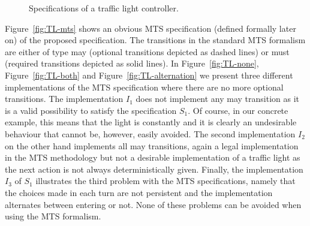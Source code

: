 \begin{figure}[ht]
{ }

\caption{Specifications of a traffic light controller.}
\end{figure}

Figure~\ref{fig:TL-mts} shows an obvious MTS specification (defined
formally later on) of the proposed specification. 
The transitions in the standard MTS formalism are either of type
may (optional transitions depicted as dashed lines) or must 
(required transitions depicted as solid lines). 
In Figure~\ref{fig:TL-none}, Figure~\ref{fig:TL-both} and 
Figure~\ref{fig:TL-alternation} we present three different implementations 
of the MTS specification where there are no more optional transitions.
The implementation $I_1$ does not implement any may transition as it  
is a valid possibility to satisfy the specification $S_1$.
Of course, in our concrete example, this means that the light is constantly
\green and it is clearly an undesirable behaviour that cannot be, however,
easily avoided. 
The second implementation $I_2$ on the %
other hand implements all may transitions, again a legal implementation
in the MTS methodology but not a desirable implementation of a traffic
light as the next action is not always deterministically given. Finally, the implementation $I_3$ of $S_1$ 
illustrates the third problem with the MTS specifications, namely
that the choices made in each turn are not persistent and the
implementation alternates between entering \yellow or not.
None of these problems can be avoided when using the MTS formalism.

